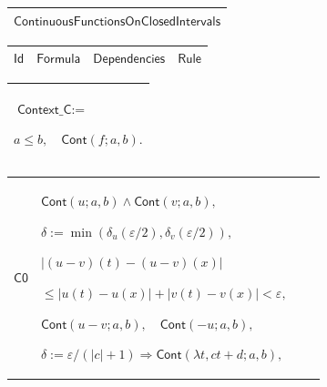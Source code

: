 \documentclass[11pt]{amsart}
\renewcommand{\arraystretch}{1.4}
\newlength{\FTCOneColumnBody}
\newlength{\FTCFourColumnBody}
\begin{document}
{\centering
\renewcommand{\arraystretch}{1.4}
\par\setlength{\parskip}{0pt}\nointerlineskip
\noindent
\begin{tabular}{|@{}>{\centering\arraybackslash}m{\FTCOneColumnBody}|}\hline
$\displaystyle \textsf{ContinuousFunctionsOnClosedIntervals}$\\ \hline
\end{tabular}%
\par\setlength{\parskip}{0pt}\nointerlineskip
\noindent
\begin{tabular}{|@{}>{\centering\arraybackslash}m{0.078431\FTCFourColumnBody}|>{\centering\arraybackslash}m{0.535947\FTCFourColumnBody}|>{\centering\arraybackslash}m{0.281045\FTCFourColumnBody}|>{\centering\arraybackslash}m{0.104575\FTCFourColumnBody}|}\hline
$\displaystyle \textsf{Id}$ & $\displaystyle \textsf{Formula}$ & $\displaystyle \textsf{Dependencies}$ & $\displaystyle \textsf{Rule}$\\ \hline
\end{tabular}%
\par\setlength{\parskip}{0pt}\nointerlineskip
\noindent
\begin{tabular}{|@{}>{\centering\arraybackslash}m{\FTCOneColumnBody}|}\hline
$\displaystyle \textsf{Context\_C}:=$\par
$\displaystyle a\le b,\quad\textsf{Cont}(f;a,b).$\\ \hline
\end{tabular}%
\par\setlength{\parskip}{0pt}\nointerlineskip
\noindent
\begin{tabular}{|@{}>{\centering\arraybackslash}m{0.078431\FTCFourColumnBody}|>{\centering\arraybackslash}m{0.535947\FTCFourColumnBody}|>{\centering\arraybackslash}m{0.281045\FTCFourColumnBody}|>{\centering\arraybackslash}m{0.104575\FTCFourColumnBody}|}\hline
\hypertarget{proof:C0}{$\displaystyle \textsf{C0}$} & $\displaystyle \textsf{Cont}(u;a,b)\land\textsf{Cont}(v;a,b),$\par
$\displaystyle \delta:=\min(\delta_u(\varepsilon/2),\delta_v(\varepsilon/2)),$\par
$\displaystyle |(u-v)(t)-(u-v)(x)|$\par
$\displaystyle {}\le|u(t)-u(x)|+|v(t)-v(x)|<\varepsilon,$\par
$\displaystyle \textsf{Cont}(u-v;a,b),\quad\textsf{Cont}(-u;a,b),$\par
$\displaystyle \delta:=\varepsilon/(|c|+1)\Rightarrow\textsf{Cont}(\lambda t,ct+d;a,b),$\par

\end{tabular}}
\end{document}
